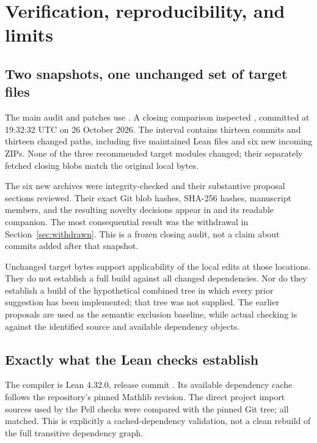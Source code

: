 \section{Verification, reproducibility, and limits}
\label{sec:validation}
\subsection{Two snapshots, one unchanged set of target files}
The main audit and patches use . A closing comparison inspected , committed at 19:32:32 UTC on 26 October 2026. The interval contains thirteen commits and thirteen changed paths, including five maintained Lean files and six new incoming ZIPs. None of the three recommended target modules changed; their separately fetched closing blobs match the original local bytes.

The six new archives were integrity-checked and their substantive proposal sections reviewed. Their exact Git blob hashes, SHA-256 hashes, manuscript members, and the resulting novelty decisions appear in  and its readable companion. The most consequential result was the withdrawal in Section~\ref{sec:withdrawn}. This is a frozen closing audit, not a claim about commits added after that snapshot.

Unchanged target bytes support applicability of the local edits at those locations. They do not establish a full build against all changed dependencies. Nor do they establish a build of the hypothetical combined tree in which every prior suggestion has been implemented; that tree was not supplied. The earlier proposals are used as the semantic exclusion baseline, while actual checking is against the identified source and available dependency objects.

\subsection{Exactly what the Lean checks establish}
The compiler is Lean 4.32.0, release commit . Its available dependency cache follows the repository's pinned Mathlib revision. The direct project import sources used by the Pell checks were compared with the pinned Git tree; all matched. This is explicitly a cached-dependency validation, not a clean rebuild of the full transitive dependency graph.

